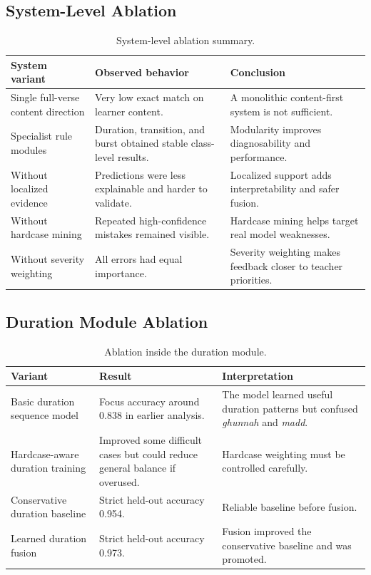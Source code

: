 \subsection{System-Level Ablation}

\begin{table}[H]
\centering
\small
\begin{tabularx}{\textwidth}{p{} p{} X}
\toprule
\textbf{System variant} & \textbf{Observed behavior} & \textbf{Conclusion} \\
\midrule
Single full-verse content direction &
Very low exact match on learner content. &
A monolithic content-first system is not sufficient. \\
\midrule
Specialist rule modules &
Duration, transition, and burst obtained stable class-level results. &
Modularity improves diagnosability and performance. \\
\midrule
Without localized evidence &
Predictions were less explainable and harder to validate. &
Localized support adds interpretability and safer fusion. \\
\midrule
Without hardcase mining &
Repeated high-confidence mistakes remained visible. &
Hardcase mining helps target real model weaknesses. \\
\midrule
Without severity weighting &
All errors had equal importance. &
Severity weighting makes feedback closer to teacher priorities. \\
\bottomrule
\end{tabularx}
\caption{System-level ablation summary.}
\label{tab:system_ablation}
\end{table}

\subsection{Duration Module Ablation}

\begin{table}[H]
\centering
\small
\begin{tabularx}{\textwidth}{p{} p{} X}
\toprule
\textbf{Variant} & \textbf{Result} & \textbf{Interpretation} \\
\midrule
Basic duration sequence model &
Focus accuracy around 0.838 in earlier analysis. &
The model learned useful duration patterns but confused \textit{ghunnah} and
\textit{madd}. \\
\midrule
Hardcase-aware duration training &
Improved some difficult cases but could reduce general balance if overused. &
Hardcase weighting must be controlled carefully. \\
\midrule
Conservative duration baseline &
Strict held-out accuracy 0.954. &
Reliable baseline before fusion. \\
\midrule
Learned duration fusion &
Strict held-out accuracy 0.973. &
Fusion improved the conservative baseline and was promoted. \\
\bottomrule
\end{tabularx}
\caption{Ablation inside the duration module.}
\label{tab:duration_ablation}
\end{table}

